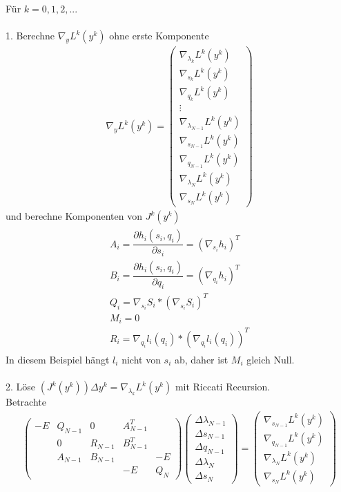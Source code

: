 \documentclass[12pt,a4paper]{article}
\begin{document}
  Für $k = 0,1,2,...$ \\
  \\
  1. Berechne $\nabla_y L^{k}(y^{k})$ ohne erste Komponente
  \begin{align*}
  \nabla_y L^{k}(y^{k}) = \left( \begin{array}{c}
  \nabla_{\lambda_{k}} L^{k}(y^{k}) \\ \hline
  \nabla_{s_{k}} L^{k}(y^{k}) \\
  \nabla_{q_{k}} L^{k}(y^{k}) \\
  \vdots \\
  \nabla_{\lambda_{N-1}} L^{k}(y^{k}) \\ 
  \nabla_{s_{N-1}} L^{k}(y^{k}) \\
  \nabla_{q_{N-1}} L^{k}(y^{k}) \\
  \nabla_{\lambda_{N}} L^{k}(y^{k}) \\ 
  \nabla_{s_{N}} L^{k}(y^{k})
  \end{array} \right) 
  \end{align*}
  und berechne Komponenten von $J^{k}(y^{k})$ \\
  \begin{align*}
  \begin{array}{l}
  A_i = \dfrac{\partial h_i(s_i,q_i)}{\partial s_i}= (\nabla_{s_i} h_i)^{T}\\ 
  B_i = \dfrac{\partial h_i(s_i,q_i)}{\partial q_i}= (\nabla_{q_i} h_i)^{T} \\
  Q_i = \nabla_{s_i} S_i *(\nabla_{s_i} S_i )^{T} \\
  M_i = 0 \\
  R_i = \nabla_{q_i} l_i(q_i) * (\nabla_{q_i} l_i(q_i))^{T}
  \end{array}
  \end{align*}
  In diesem Beispiel hängt $ l_i $ nicht von $s_i$ ab, daher ist $M_i$ gleich Null. \\
  \\
  2. Löse $ (J^{k}(y^{k})) \Delta y^{k} = \nabla_{\lambda_k} L^{k}(y^{k}) $ mit Riccati Recursion.\\
  Betrachte
  \begin{align*}
  \begin{pmatrix}
  -E & Q_{N-1} & 0 & A_{N-1}^{T} &  \\
     & 0 & R_{N-1} & B_{N-1}^{T} &  \\
     & A_{N-1} & B_{N-1} &   & -E \\
     &   &   & -E & Q_N
  \end{pmatrix}
  \begin{pmatrix}
  \Delta \lambda_{N-1} \\
  \Delta s_{N-1} \\
  \Delta q_{N-1} \\
  \Delta \lambda_{N} \\
  \Delta s_N
  \end{pmatrix} =
  \begin{pmatrix}
  \nabla_{s_{N-1}} L^{k}(y^{k}) \\
  \nabla_{q_{N-1}} L^{k}(y^{k}) \\
  \nabla_{\lambda_{N}} L^{k}(y^{k}) \\ 
  \nabla_{s_{N}} L^{k}(y^{k})
  \end{pmatrix}
  \end{align*}
\end{document}
